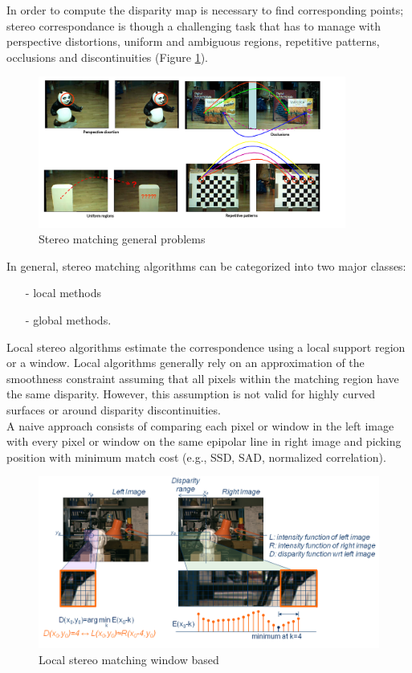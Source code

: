 In order to compute the disparity map is necessary to find corresponding points; stereo correspondance is though a challenging task that has to manage with perspective distortions, uniform and ambiguous regions, repetitive patterns, occlusions and discontinuities (Figure \ref{fig:occl}).\\
\begin{figure}[h!]
\centering
\includegraphics[width=0.9\textwidth]{./img/occl.png}
\caption{\small{Stereo matching general problems}}
\label{fig:occl}
\end{figure}
\clearpage
In general, stereo matching algorithms can be categorized into two major classes:
\begin{itemize}
\item[-] local methods 
\item[-] global methods.
\end{itemize}
Local stereo algorithms estimate the correspondence using a local support region or a window. Local algorithms generally rely on an approximation of the smoothness constraint assuming that all pixels within the matching region have the same disparity. However, this assumption is not valid for highly curved surfaces or around disparity discontinuities.\\
A naive approach consists of comparing each  pixel or window in the left image with every pixel or window on the same epipolar line in right image and picking position with minimum match cost (e.g., SSD, SAD, normalized correlation).\\ 
\begin{figure}[h!]
\centering
\includegraphics[width=1\textwidth]{./img/local.png}
\caption{\small{Local stereo matching window based}}
\label{fig:local}
\end{figure}
